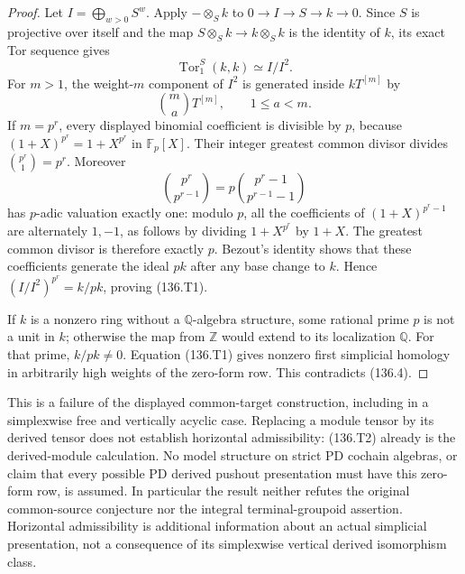 \begin{proof}
Let $I=\bigoplus_{w>0}S^w$. Apply $-\otimes_S k$ to
$0\to I\to S\to k\to0$. Since $S$ is projective over
itself and the map $S\otimes_S k\to k\otimes_S k$ is
the identity of $k$, its exact Tor sequence gives
\[
                         \operatorname{Tor}_1^S(k,k)
                           \simeq I/I^2.
\]
For $m>1$, the weight-$m$ component of $I^2$ is generated
inside $kT^{[m]}$ by
\[
              \binom ma T^{[m]},\qquad 1\leq a<m.
\]
If $m=p^r$, every displayed binomial coefficient is divisible
by $p$, because $(1+X)^{p^r}=1+X^{p^r}$ in $\mathbb F_p[X]$.
Their integer greatest common divisor divides
$\binom{p^r}{1}=p^r$. Moreover
\[
 \binom{p^r}{p^{r-1}}
   =p\binom{p^r-1}{p^{r-1}-1}
\]
has $p$-adic valuation exactly one: modulo $p$, all the
coefficients of $(1+X)^{p^r-1}$ are alternately $1,-1$,
as follows by dividing $1+X^{p^r}$ by $1+X$.
The greatest common divisor is therefore exactly $p$.
Bezout's identity shows that these coefficients generate
the ideal $pk$ after any base change to $k$. Hence
$(I/I^2)^{p^r}=k/pk$, proving (136.T1).

If $k$ is a nonzero ring without a $\mathbb Q$-algebra
structure, some rational prime $p$ is not a unit in $k$;
otherwise the map from $\mathbb Z$ would extend to its
localization $\mathbb Q$. For that prime, $k/pk\ne0$.
Equation (136.T1) gives nonzero first simplicial homology
in arbitrarily high weights of the zero-form row. This
contradicts (136.4). \qedhere
\end{proof}

This is a failure of the displayed common-target construction,
including in a simplexwise free and vertically acyclic case.
Replacing a module tensor by its derived tensor does not
establish horizontal admissibility: (136.T2) already is the
derived-module calculation. No model structure on strict PD
cochain algebras, or claim that every possible PD derived
pushout presentation must have this zero-form row, is assumed.
In particular the result neither refutes the original
common-source conjecture nor the integral terminal-groupoid
assertion. Horizontal admissibility is additional information
about an actual simplicial presentation, not a consequence
of its simplexwise vertical derived isomorphism class.


